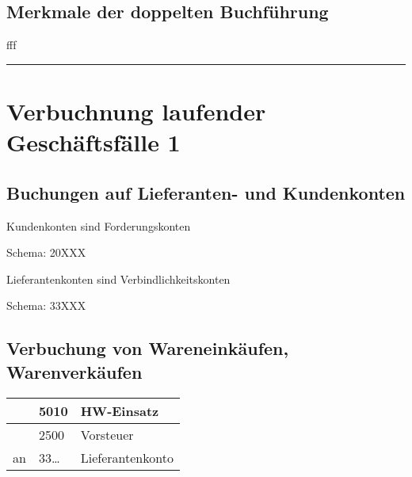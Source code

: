 \documentclass[letterpaper,10pt,english]{sphinxmanual}
\begin{document}
\subsection{Merkmale der doppelten Buchführung}
\label{\detokenize{pool1:merkmale-der-doppelten-buchfuhrung}}
fff


\bigskip\hrule\bigskip



\section{Verbuchnung laufender Geschäftsfälle 1}
\label{\detokenize{pool1:verbuchnung-laufender-geschaftsfalle-1}}

\subsection{Buchungen auf Lieferanten- und Kundenkonten}
\label{\detokenize{pool1:buchungen-auf-lieferanten-und-kundenkonten}}

\begin{DUlineblock}{0em}
\item[] Kundenkonten sind Forderungskonten
\item[] Schema: 20XXX
\end{DUlineblock}


\begin{DUlineblock}{0em}
\item[] Lieferantenkonten sind Verbindlichkeitskonten
\item[] Schema: 33XXX
\end{DUlineblock}


\subsection{Verbuchung von Wareneinkäufen, Warenverkäufen}
\label{\detokenize{pool1:verbuchung-von-wareneinkaufen-warenverkaufen}}


\begin{savenotes}\sphinxattablestart
\centering
\begin{tabulary}{\linewidth}[t]{|T|T|T|}
\hline
&
5010
&
HW-Einsatz
\\
\hline&
2500
&
Vorsteuer
\\
\hline
an
&
33…
&
Lieferantenkonto
\\
\hline
\end{tabulary}
\par
\sphinxattableend\end{savenotes}
\end{document}
